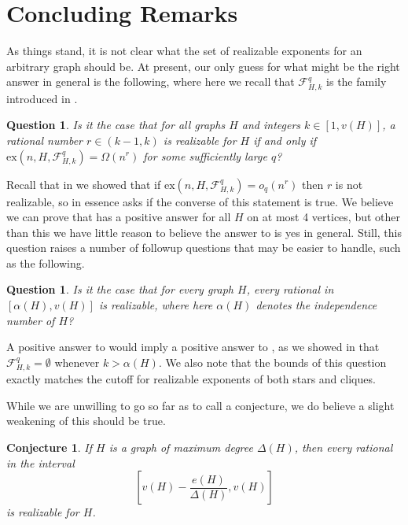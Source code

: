 \documentclass[12pt,letterpaper]{article}
\newtheorem{question}[theorem]{Question}
\newtheorem{conjecture}[theorem]{Conjecture}
\theoremstyle{definition}
\newcommand{\pow}{q} %
\newcommand{\re}{r} %
\newcommand{\ex}{\mathrm{ex}}
\renewcommand{\c}[1]{\mathcal{#1}}
\newcommand{\Om}{\Omega}
\newcommand{\Del}{\Delta}
\newcommand{\al}{\alpha}
\begin{document}
	\section{Concluding Remarks}\label{section concluding remarks}
	As things stand, it is not clear what the set of realizable exponents for an arbitrary graph should be.  At present, our only guess for what might be the right answer in general is the following, where here we recall that $\c{F}_{H,k}^\pow$ is the family introduced in .
	\begin{question}\label{question:obviousObstruction}
		Is it the case that for all graphs $H$ and integers $k\in [1,v(H)]$, a rational number $\re\in (k-1,k)$ is realizable for $H$ if and only if $\ex(n,H,\c{F}_{H,k}^\pow)=\Om(n^\re)$ for some sufficiently large $\pow$?
	\end{question}
	Recall that in  we showed that if $\ex(n,H,\c{F}_{H,k}^\pow)=o_\pow(n^\re)$ then $\re$ is not realizable, so  in essence asks if the converse of this statement is true.  We believe we can prove that  has a positive answer for all $H$ on at most 4 vertices, but other than this we have little reason to believe the answer to  is yes in general.  Still, this question raises a number of followup questions that may be easier to handle, such as the following.
	
	\begin{question}\label{question:independenceNumber}
		Is it the case that for every graph $H$, every rational in $[\al(H),v(H)]$ is realizable, where here $\al(H)$ denotes the independence number of $H$?
	\end{question}
	A positive answer to  would imply a positive answer to , as we showed in  that $\c{F}_{H,k}^\pow=\emptyset$ whenever $k> \al(H)$.  We also note that the bounds of this question exactly matches the cutoff for realizable exponents of both stars and cliques.
	
	While we are unwilling to go so far as to call  a conjecture, we do believe a slight weakening of this should be true.
	
	\begin{conjecture}\label{conjecture:maxDegree}
		If $H$ is a graph of maximum degree $\Del(H)$, then every rational in the interval
		\[
		\left[v(H)-\frac{e(H)}{\Del(H)},v(H)\right]
		\]
		is realizable for $H$.
	\end{conjecture}
	
\end{document}
